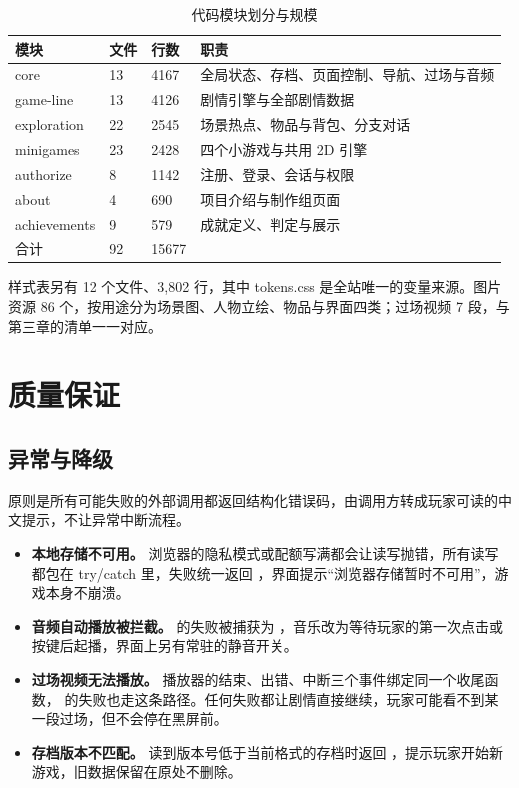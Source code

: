 \begin{table}[htbp]
\centering
\caption{代码模块划分与规模}
\label{tab:modules}
\small
\begin{tabularx}{\linewidth}{@{}l l l X@{}}
\toprule
模块 & 文件 & 行数 & 职责 \\
\midrule
core         & 13 & 4167 & 全局状态、存档、页面控制、导航、过场与音频 \\
game-line    & 13 & 4126 & 剧情引擎与全部剧情数据 \\
exploration  & 22 & 2545 & 场景热点、物品与背包、分支对话 \\
minigames    & 23 & 2428 & 四个小游戏与共用 2D 引擎 \\
authorize    &  8 & 1142 & 注册、登录、会话与权限 \\
about        &  4 &  690 & 项目介绍与制作组页面 \\
achievements &  9 &  579 & 成就定义、判定与展示 \\
\midrule
合计         & 92 & 15677 & \\
\bottomrule
\end{tabularx}
\end{table}

样式表另有 12 个文件、3{,}802 行，其中 tokens.css 是全站唯一的变量来源。图片资源 86 个，按用途分为场景图、人物立绘、物品与界面四类；过场视频 7 段，与第三章的清单一一对应。

\section{质量保证}

\subsection{异常与降级}

原则是所有可能失败的外部调用都返回结构化错误码，由调用方转成玩家可读的中文提示，不让异常中断流程。

\begin{itemize}
  \item \textbf{本地存储不可用。} 浏览器的隐私模式或配额写满都会让读写抛错，所有读写都包在 try/catch 里，失败统一返回 ，界面提示“浏览器存储暂时不可用”，游戏本身不崩溃。
  \item \textbf{音频自动播放被拦截。}  的失败被捕获为 ，音乐改为等待玩家的第一次点击或按键后起播，界面上另有常驻的静音开关。
  \item \textbf{过场视频无法播放。} 播放器的结束、出错、中断三个事件绑定同一个收尾函数， 的失败也走这条路径。任何失败都让剧情直接继续，玩家可能看不到某一段过场，但不会停在黑屏前。
  \item \textbf{存档版本不匹配。} 读到版本号低于当前格式的存档时返回 ，提示玩家开始新游戏，旧数据保留在原处不删除。
\end{itemize}

